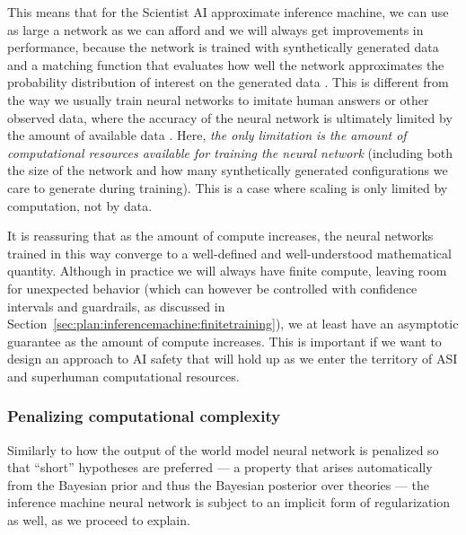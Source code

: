 This means that for the Scientist AI approximate inference machine, we can use as large a network as we can afford and we will always get improvements in performance, because the network is trained with synthetically generated data and a matching function that evaluates how well the network approximates the probability distribution of interest on the generated data \cite{openreview.net.forum.id.uKiE0VIluA}. This is different from the way we usually train neural networks to imitate human answers or other observed data, where the accuracy of the neural network is ultimately limited by the amount of available data \cite{arxiv.org.abs.2001.08361}. Here, \emph{the only limitation is the amount of computational resources available for training the neural network} (including both the size of the network and how many synthetically generated configurations we care to generate during training). This is a case where scaling is only limited by computation, not by data.

It is reassuring that as the amount of compute increases, the neural networks trained in this way converge to a well-defined and well-understood mathematical quantity. Although in practice we will always have finite compute, leaving room for unexpected behavior (which can however be controlled with confidence intervals and guardrails, as discussed in Section~\ref{sec:plan:inferencemachine:finitetraining}), we at least have an asymptotic guarantee as the amount of compute increases. This is important if we want to design an approach to AI safety that will hold up as we enter the territory of ASI and superhuman computational resources.


\subsubsection{Penalizing computational complexity}\label{sec:plan:inferencemachine:penalizingcomplexity}
    
Similarly to how the output of the world model neural network is penalized so that ``short'' hypotheses are preferred --- a property that arises automatically from the Bayesian prior and thus the Bayesian posterior over theories --- the inference machine neural network is subject to an implicit form of regularization as well, as we proceed to explain.

